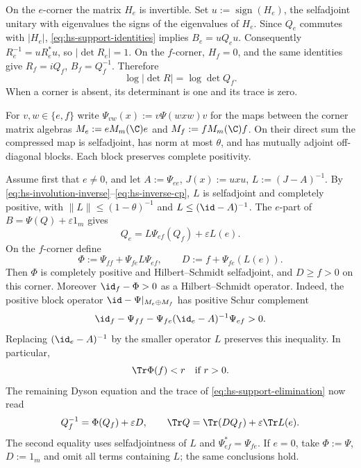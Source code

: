 On the $e$-corner the matrix $H_e$ is invertible.
Set $u:=\operatorname{sign}(H_e)$, the selfadjoint unitary with eigenvalues the signs of the eigenvalues of $H_e$.
Since $Q_e$ commutes with $|H_e|$, \eqref{eq:hs-support-identities} implies $B_e=uQ_eu$.
Consequently $R_e^{-1}=uR_e^*u$, so $|\det R_e|=1$.
On the $f$-corner, $H_f=0$, and the same identities give $R_f=iQ_f$, $B_f=Q_f^{-1}$.
Therefore
\begin{equation}\label{eq:hs-kernel-determinant}
 \log|\det R|=\log\det Q_f.
\end{equation}
When a corner is absent, its determinant is one and its trace is zero.

For $v,w\in\{e,f\}$ write $\Psi_{vw}(x):=v\Psi(wxw)v$ for the maps between the corner matrix algebras $M_e:=eM_m(\C)e$ and $M_f:=fM_m(\C)f$.
On their direct sum the compressed map is selfadjoint, has norm at most $\theta$, and has mutually adjoint off-diagonal blocks.
Each block preserves complete positivity.

Assume first that $e\ne0$, and let $A:=\Psi_{ee}$, $J(x):=uxu$, $L:=(J-A)^{-1}$.
By \eqref{eq:hs-involution-inverse}--\eqref{eq:hs-inverse-cp}, $L$ is selfadjoint and completely positive, with $\|L\|\le(1-\theta)^{-1}$ and $L\le(\id-A)^{-1}$.
The $e$-part of $B=\Psi(Q)+\varepsilon1_m$ gives
\begin{equation}\label{eq:hs-support-elimination}
 Q_e=L\Psi_{ef}(Q_f)+\varepsilon L(e).
\end{equation}
On the $f$-corner define
\begin{equation}\label{eq:hs-effective-data}
 \Phi:=\Psi_{ff}+\Psi_{fe}L\Psi_{ef},\qquad
 D:=f+\Psi_{fe}(L(e)).
\end{equation}
Then $\Phi$ is completely positive and Hilbert--Schmidt selfadjoint, and $D\ge f>0$ on this corner.
Moreover $\id_f-\Phi>0$ as a Hilbert--Schmidt operator.
Indeed, the positive block operator $\id-\Psi|_{M_e\oplus M_f}$ has positive Schur complement
\[
 \id_f-\Psi_{ff}-\Psi_{fe}(\id_e-A)^{-1}\Psi_{ef}>0.
\]
Replacing $(\id_e-A)^{-1}$ by the smaller operator $L$ preserves this inequality.
In particular,
\begin{equation}\label{eq:hs-effective-trace}
 \Tr\Phi(f)<r\quad\text{if }r>0.
\end{equation}
The remaining Dyson equation and the trace of \eqref{eq:hs-support-elimination} now read
\begin{equation}\label{eq:hs-effective-equation}
 Q_f^{-1}=\Phi(Q_f)+\varepsilon D,\qquad
 \Tr Q=\Tr(DQ_f)+\varepsilon\Tr L(e).
\end{equation}
The second equality uses selfadjointness of $L$ and $\Psi_{ef}^*=\Psi_{fe}$.
If $e=0$, take $\Phi:=\Psi$, $D:=1_m$ and omit all terms containing $L$; the same conclusions hold.


